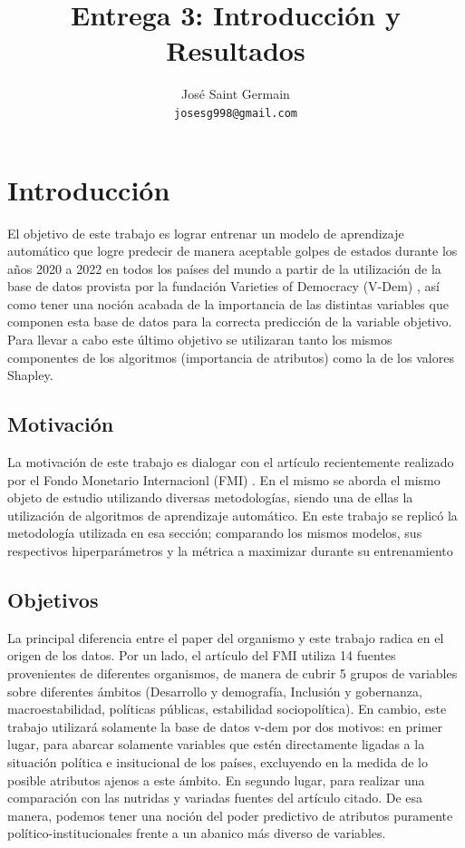 \documentclass{article}
\title{Entrega 3: Introducción y Resultados}
\author{%
  José Saint Germain\\
  \texttt{josesg998@gmail.com} \\
}
\begin{document}
\maketitle

\tableofcontents
\pagebreak

\section{Introducción}



El objetivo de este trabajo es lograr entrenar un modelo de aprendizaje automático
que logre predecir de manera aceptable golpes de estados durante los años 2020 a 2022 
en todos los países del mundo a partir de la utilización de la base de datos provista 
por la fundación Varieties of Democracy (V-Dem) \cite{Cop24}, así como tener una noción 
acabada de la importancia de las distintas variables que componen esta base de datos para 
la correcta predicción de la variable objetivo. Para llevar a cabo este último objetivo 
se utilizaran tanto los mismos componentes de los algoritmos (importancia de atributos)
como la de los valores Shapley.

\subsection{Motivación}
La motivación de este trabajo es dialogar con el artículo recientemente realizado por el 
Fondo Monetario Internacionl (FMI) \cite{Ceb24}. En el mismo se aborda  el mismo objeto 
de estudio utilizando diversas metodologías, siendo una de ellas la utilización de 
algoritmos de aprendizaje automático. En este trabajo se replicó la metodología utilizada 
en esa sección; comparando los mismos modelos, sus respectivos hiperparámetros y la 
métrica a maximizar durante su entrenamiento

\subsection{Objetivos}
La principal diferencia entre el paper del organismo y este trabajo radica en el origen
de los datos. Por un lado, el artículo del FMI utiliza 14 fuentes provenientes de 
diferentes organismos, de manera de cubrir 5 grupos de variables sobre diferentes ámbitos 
(Desarrollo y demografía, Inclusión y gobernanza, macroestabilidad, políticas públicas, 
estabilidad sociopolítica). En cambio, este trabajo utilizará solamente la base de datos 
v-dem por dos motivos: en primer lugar, para abarcar solamente variables que estén 
directamente ligadas a la situación política e insitucional de los países, excluyendo en 
la medida de lo posible atributos ajenos a este ámbito. En segundo lugar, para realizar 
una comparación con las nutridas y variadas fuentes del artículo citado. De esa manera, 
podemos tener una noción del poder predictivo de atributos puramente 
político-institucionales frente a un abanico más diverso de variables.
\end{document}
